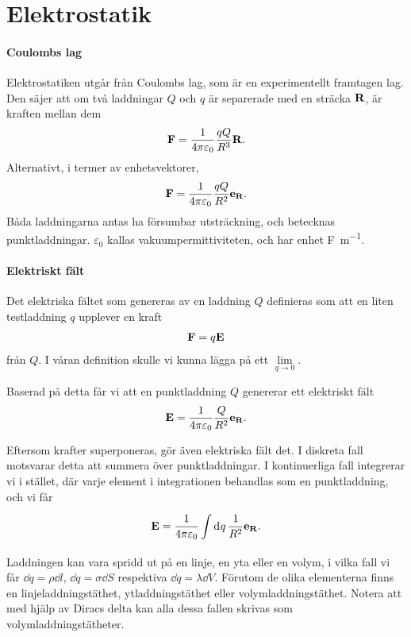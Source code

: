 \section{Elektrostatik}

\paragraph{Coulombs lag}
Elektrostatiken utgår från Coulombs lag, som är en experimentellt framtagen lag. Den säjer att om två laddningar $Q$ och $q$ är separerade med en sträcka $\vb{R}$, är kraften mellan dem
\begin{align*}
	\vb{F} = \frac{1}{4\pi\varepsilon_{0}}\frac{qQ}{R^{3}}\vb{R}.
\end{align*}
Alternativt, i termer av enhetsvektorer,
\begin{align*}
	\vb{F} = \frac{1}{4\pi\varepsilon_{0}}\frac{qQ}{R^{2}}\vb{e}_{\vb{R}}.
\end{align*}
Båda laddningarna antas ha försumbar utsträckning, och betecknas punktladdningar. $\varepsilon_{0}$ kallas vakuumpermittiviteten, och har enhet \si{\farad\per\meter}.

\paragraph{Elektriskt fält}
Det elektriska fältet som genereras av en laddning $Q$ definieras som att en liten testladdning $q$ upplever en kraft
\begin{align*}
	\vb{F} = q\vb{E}
\end{align*}
från $Q$. I våran definition skulle vi kunna lägga på ett $\lim\limits_{q\to 0}$.

Baserad på detta får vi att en punktladdning $Q$ genererar ett elektriskt fält
\begin{align*}
	\vb{E} = \frac{1}{4\pi\varepsilon_{0}}\frac{Q}{R^{2}}\vb{e}_{\vb{R}}.
\end{align*}

Eftersom krafter superponeras, gör även elektriska fält det. I diskreta fall motsvarar detta att summera över punktladdningar. I kontinuerliga fall integrerar vi i stället, där varje element i integrationen behandlas som en punktladdning, och vi får
\begin{align*}
	\vb{E} = \frac{1}{4\pi\varepsilon_{0}}\int\limits_{}^{}\dd[]{q}\frac{1}{R^{2}}\vb{e}_{\vb{R}}.
\end{align*}
Laddningen kan vara spridd ut på en linje, en yta eller en volym, i vilka fall vi får $\dd{q} = \rho\dd{l}$, $\dd{q} = \sigma\dd{S}$ respektiva $\dd{q} = \lambda\dd{V}$. Förutom de olika elementerna finns en linjeladdningstäthet, ytladdningstäthet eller volymladdningstäthet. Notera att med hjälp av Diracs delta kan alla dessa fallen skrivas som volymladdningstätheter.

